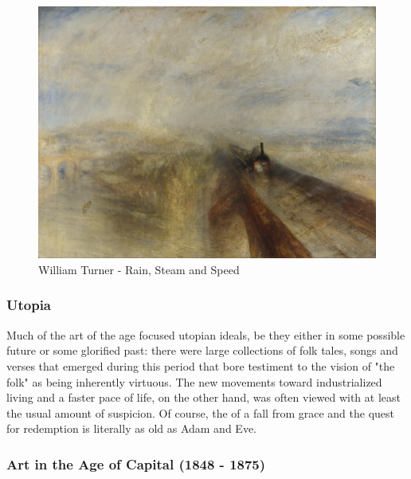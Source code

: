\documentclass[11pt]{article}
\begin{document}
\begin{figure}[htbp]
\centering
\includegraphics[width=.9\linewidth]{./Turner_-_Rain,_Steam_and_Speed_-_National_Gallery_file.jpg}
\caption{William Turner - Rain, Steam and Speed}
\end{figure} 

\subsubsection{Utopia}
\label{sec:org8451047}

Much of the art of the age focused utopian ideals, be they either in
some possible future or some glorified past: there were large
collections of folk tales, songs and verses that emerged during this
period that bore testiment to the vision of "the folk" as being
inherently virtuous. The new movements toward industrialized living
and a faster pace of life, on the other hand, was often viewed with at
least the usual amount of suspicion. Of course, the of a fall from
grace and the quest for redemption is literally as old as Adam and Eve.

\subsubsection{Art in the Age of Capital (1848 - 1875)}
\label{sec:org7fd21b6}
\end{document}
